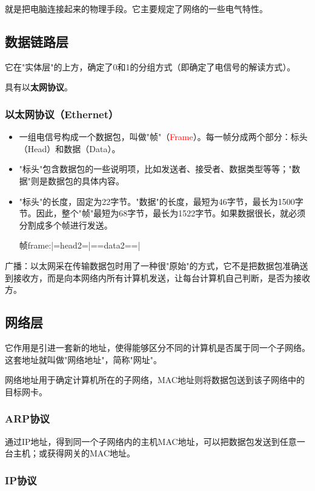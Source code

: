 \documentclass[UTF8]{article}%
\begin{document}
就是把电脑连接起来的物理手段。它主要规定了网络的一些电气特性。

\subsection{数据链路层}

它在"实体层"的上方，确定了0和1的分组方式（即确定了电信号的解读方式）。

具有以\textbf{太网协议}。

\subsubsection{以太网协议（Ethernet）}

\begin{itemize}
    \item 一组电信号构成一个数据包，叫做"帧"（\textcolor{red}{Frame}）。每一帧分成两个部分：标头（Head）和数据（Data）。
    \item "标头"包含数据包的一些说明项，比如发送者、接受者、数据类型等等；"数据"则是数据包的具体内容。
    \item "标头"的长度，固定为22字节。"数据"的长度，最短为46字节，最长为1500字节。因此，整个"帧"最短为68字节，最长为1522字节。如果数据很长，就必须分割成多个帧进行发送。
    
    帧frame:|=head2=|==data2==|

\end{itemize}

广播：以太网采在传输数据包时用了一种很"原始"的方式，它不是把数据包准确送到接收方，而是向本网络内所有计算机发送，让每台计算机自己判断，是否为接收方。

\subsection{网络层}

它作用是引进一套新的地址，使得能够区分不同的计算机是否属于同一个子网络。这套地址就叫做"网络地址"，简称"网址"。

网络地址用于确定计算机所在的子网络，MAC地址则将数据包送到该子网络中的目标网卡。

\subsubsection{ARP协议}

通过IP地址，得到同一个子网络内的主机MAC地址，可以把数据包发送到任意一台主机；或获得网关的MAC地址。

\subsubsection{IP协议}
\end{document}
